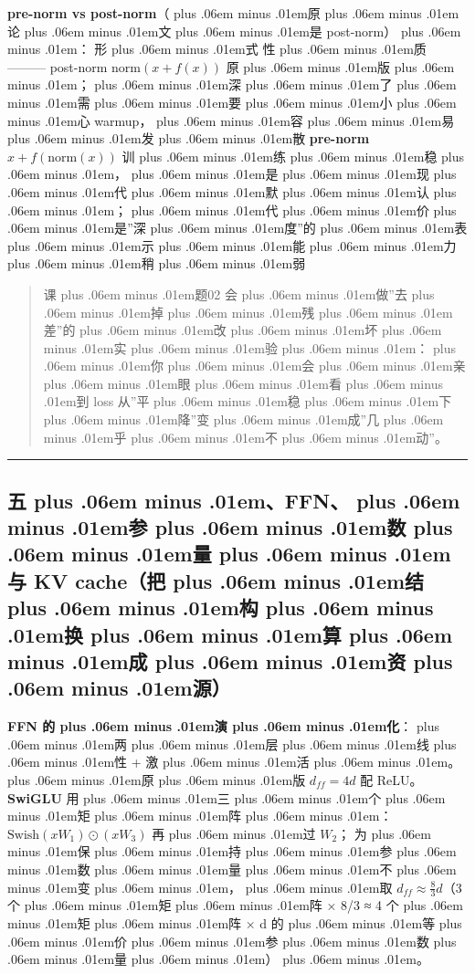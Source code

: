 \documentclass[
]{article}
\providecommand{\texorpdfstring}[2]{#1}   %
\def\zh#1{{\zhfont #1}}
\def\sym#1{{\symfont #1}}
\def\zhglue{\hskip0pt plus .06em minus .01em}
\begin{document}
\textbf{pre-norm vs post-norm}\zh{（\zhglue 原\zhglue 论\zhglue 文\zhglue 是} post-norm\zh{）\zhglue ：} \textbar{} \textbar{} \zh{形\zhglue 式} \textbar{} \zh{性\zhglue 质} \textbar{} \textbar---\textbar---\textbar---\textbar{} \textbar{} post-norm \textbar{} \(\mathrm{norm}(x + f(x))\) \textbar{} \zh{原\zhglue 版\zhglue ；\zhglue 深\zhglue 了\zhglue 需\zhglue 要\zhglue 小\zhglue 心} warmup\zh{，\zhglue 容\zhglue 易\zhglue 发\zhglue 散} \textbar{} \textbar{} \textbf{pre-norm} \textbar{} \(x + f(\mathrm{norm}(x))\) \textbar{} \zh{训\zhglue 练\zhglue 稳\zhglue ，\zhglue 是\zhglue 现\zhglue 代\zhglue 默\zhglue 认\zhglue ；\zhglue 代\zhglue 价\zhglue 是}''\zh{深\zhglue 度}''\zh{的\zhglue 表\zhglue 示\zhglue 能\zhglue 力\zhglue 稍\zhglue 弱} \textbar{}

\begin{quote}
\zh{课\zhglue 题}02 \zh{会\zhglue 做}''\zh{去\zhglue 掉\zhglue 残\zhglue 差}''\zh{的\zhglue 改\zhglue 坏\zhglue 实\zhglue 验\zhglue ：\zhglue 你\zhglue 会\zhglue 亲\zhglue 眼\zhglue 看\zhglue 到} loss \zh{从}''\zh{平\zhglue 稳\zhglue 下\zhglue 降}''\zh{变\zhglue 成}''\zh{几\zhglue 乎\zhglue 不\zhglue 动}''\zh{。}
\end{quote}

\begin{center}\rule{0.5\linewidth}{0.5pt}\end{center}

\subsection{\texorpdfstring{\zh{五\zhglue 、}FFN\zh{、\zhglue 参\zhglue 数\zhglue 量\zhglue 与} KV cache\zh{（}\textbf{\zh{把\zhglue 结\zhglue 构\zhglue 换\zhglue 算\zhglue 成\zhglue 资\zhglue 源}}\zh{）}}{\zh{五\zhglue 、}FFN\zh{、\zhglue 参\zhglue 数\zhglue 量\zhglue 与} KV cache\zh{（\zhglue 把\zhglue 结\zhglue 构\zhglue 换\zhglue 算\zhglue 成\zhglue 资\zhglue 源\zhglue ）}}}\label{ux4e94ffnux53c2ux6570ux91cfux4e0e-kv-cacheux628aux7ed3ux6784ux6362ux7b97ux6210ux8d44ux6e90}

\textbf{FFN \zh{的\zhglue 演\zhglue 化}}\zh{：\zhglue 两\zhglue 层\zhglue 线\zhglue 性} + \zh{激\zhglue 活\zhglue 。\zhglue 原\zhglue 版} \(d_{ff} = 4d\) \zh{配} ReLU\zh{。} \textbf{SwiGLU} \zh{用\zhglue 三\zhglue 个\zhglue 矩\zhglue 阵\zhglue ：}\(\mathrm{Swish}(xW_1)\odot(xW_3)\) \zh{再\zhglue 过} \(W_2\)\zh{；} \zh{为\zhglue 保\zhglue 持\zhglue 参\zhglue 数\zhglue 量\zhglue 不\zhglue 变\zhglue ，\zhglue 取} \(d_{ff} \approx \tfrac{8}{3}d\)\zh{（}3 \zh{个\zhglue 矩\zhglue 阵} \sym{×} 8/3 \sym{≈} 4 \zh{个\zhglue 矩\zhglue 阵} \sym{×} d \zh{的\zhglue 等\zhglue 价\zhglue 参\zhglue 数\zhglue 量\zhglue ）\zhglue 。}
\end{document}
